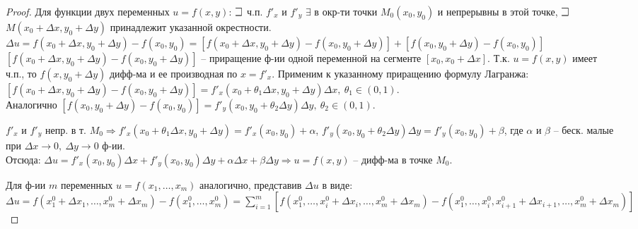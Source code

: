 \begin{proof}
Для функции двух переменных $u=f(x,y)$: $\mathLet$ ч.п. $f'_x$ и $f'_y$ $ \exists$ в окр-ти точки $M_0(x_0,y_0)$ и непрерывны в этой точке, $\mathLet$ $M(x_0+\Delta x, y_0 + \Delta y)$ принадлежит указанной окрестности. \\
$\Delta u=f(x_0+\Delta x, y_0+\Delta y) - f(x_0, y_0) = [f(x_0+\Delta x, y_0+\Delta y)-f(x_0, y_0+\Delta y)] + [f(x_0, y_0+\Delta y) - f(x_0, y_0)]$ \\
$[f(x_0+\Delta x, y_0+\Delta y)-f(x_0, y_0+\Delta y)]$ -- приращение ф-ии одной переменной на сегменте $[x_0, x_0+\Delta x]$. Т.к. $u = f(x,y)$ имеет ч.п., то $f(x, y_0+\Delta y)$ дифф-ма и ее производная по $x = f'_x$. Применим к указанному приращению формулу Лагранжа: \\
$[f(x_0+\Delta x, y_0+\Delta y)-f(x_0, y_0+\Delta y)] = f'_x(x_0+\theta_1\Delta x, y_0+\Delta y)\Delta x, ~ \theta_1 \in (0,1)$.\\
Аналогично 
$[f(x_0, y_0+\Delta y)-f(x_0, y_0)] = f'_y(x_0, y_0+\theta_2\Delta y)\Delta y, ~ \theta_2 \in (0,1)$.

$f'_x$ и $f'_y$ непр. в т. $M_0 \Rightarrow f'_x(x_0+\theta_1\Delta x, y_0+\Delta y)=f'_x(x_0,y_0) + \alpha$, $f'_y(x_0, y_0+\theta_2\Delta y)\Delta y=f'_y(x_0,y_0) + \beta$, где $\alpha$ и $\beta$ -- беск. малые при $\Delta x \to 0, ~ \Delta y \to 0$ ф-ии. \\
Отсюда: $\Delta u=f'_x(x_0,y_0)\Delta x + f'_y(x_0,y_0)\Delta y + \alpha\Delta x + \beta\Delta y \Rightarrow u = f(x,y)$ -- дифф-ма в точке $M_0$.

Для ф-ии $m$ переменных $u=f(x_1, \dots, x_m)$ аналогично, представив $\Delta u$  в виде: \\
$\Delta u = f(x^0_1+\Delta x_1, \dots, x^0_m+\Delta x_m) - f(x^0_1, \dots, x^0_m) = \sum_{i=1}^{m}[f(x^0_1, \dots, x^0_i+\Delta x_i, \dots, x^0_m+\Delta x_m) - f(x^0_1, \dots, x^0_i, x^0_{i+1}+\Delta x_{i+1}, \dots, x^0_m+\Delta x_m)]$
\end{proof}




